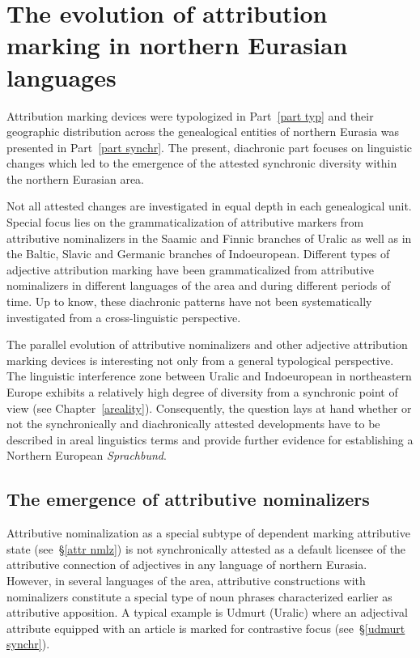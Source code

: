 
\chapter[The evolution of attribution marking]{The evolution of attribution marking in northern Eurasian languages}
Attribution marking devices were typologized in Part~\ref{part typ} and their geographic distribution across the genealogical entities of northern Eurasia was presented in Part~\ref{part synchr}. The present, diachronic part focuses on linguistic changes which led to the emergence of the attested synchronic diversity within the northern Eurasian area.

Not all attested changes are investigated in equal depth in each genealogical unit. Special focus lies on the grammaticalization of attributive markers from attributive nominalizers in the Saamic and Finnic branches of Uralic as well as in the Baltic, Slavic and Germanic branches of Indoeuropean. Different types of adjective attribution marking have been grammaticalized from attributive nominalizers in different languages of the area and during different periods of time. Up to know, these diachronic patterns have not been systematically investigated from a cross-linguistic perspective.

The parallel evolution of attributive nominalizers and other adjective attribution marking devices is interesting not only from a general typological perspective. The linguistic interference zone between Uralic and Indoeuropean in northeastern Europe exhibits a relatively high degree of diversity from a synchronic point of view (see Chapter~\ref{areality}). Consequently, the question lays at hand whether or not the synchronically and diachronically attested developments have to be described in areal linguistics terms and provide further evidence for establishing a Northern European \textit{Sprachbund}.

\section[Attributive nominalizers]{The emergence of attributive nominalizers}
Attributive nominalization as a special subtype of dependent marking attributive state (see~\S\ref{attr nmlz}) is not synchronically attested as a default licensee of the attributive connection of adjectives in any language of northern Eurasia. However, in several languages of the area, attributive constructions with nominalizers constitute a special type of noun phrases characterized earlier as attributive apposition. A typical example is Udmurt (Uralic) where an adjectival attribute equipped with an article is marked for contrastive focus (see~\S\ref{udmurt synchr}).

